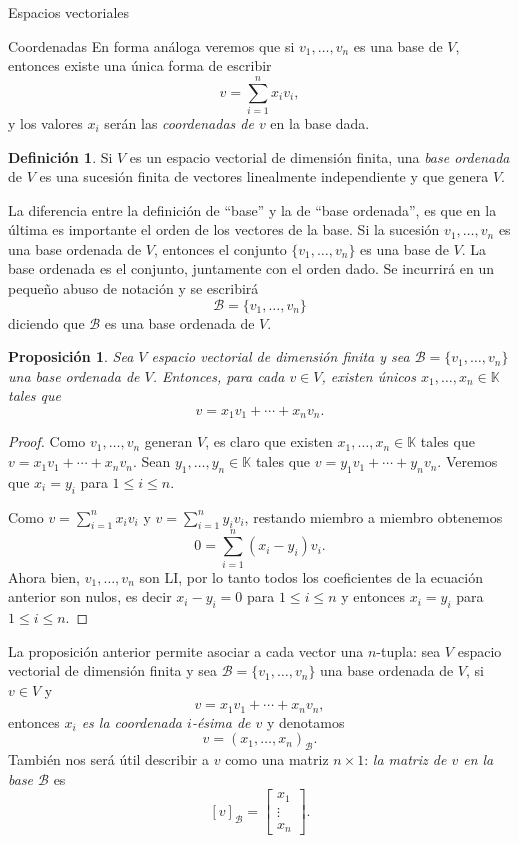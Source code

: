 \documentclass[a4paper,12pt,twoside,spanish,reqno]{amsbook}
\newtheorem{proposicion}[teorema]{Proposici\'on}
\theoremstyle{definition}
\newtheorem{definicion}{Definici\'on}[section]
\theoremstyle{remark}
\newcommand{\K}{\mathbb K}
\begin{document}
\begin{chapter}{Espacios vectoriales}
\begin{section}{Coordenadas}
		En  forma análoga veremos que si $v_1,\ldots,v_n$  es una base de $V$,  entonces existe una única forma de  escribir 
		$$
		v =  \sum_{i=1}^{n} x_iv_i,
		$$ 
		y los valores  $x_i$  serán las \textit{coordenadas de $v$} en la base dada. 
		
		\begin{definicion}
			Si $V$ es un espacio vectorial de dimensión finita, una \textit{base ordenada} de $V$ es una sucesión finita de vectores linealmente independiente y que genera $V$.
		\end{definicion}
		
		
		La diferencia entre la definición de ``base'' y la de ``base ordenada'',  es que en la última es  importante el orden de los vectores de la base. Si la sucesión $v_1,\ldots,v_n$ es una base ordenada de $V$, entonces el conjunto $\{v_1,\ldots,v_n\}$ es una base de $V$. La base ordenada es el conjunto, juntamente con el orden dado. Se incurrirá en un pequeño abuso de notación y se escribirá
		$$
		\mathcal{B} = \{v_1,\ldots,v_n\}
		$$
		diciendo que $\mathcal{B}$ es una base ordenada de $V$.
		
		\begin{proposicion}
			Sea $V$  espacio vectorial de dimensión finita y sea $\mathcal{B} = \{v_1,\ldots,v_n\}$ una base ordenada de $V$. Entonces, para cada $v \in V$,  existen únicos $x_1,\ldots,x_n \in \K$ tales que $$v =   x_1v_1 + \cdots +x_nv_n.$$
		\end{proposicion}
		\begin{proof}
			Como $v_1,\ldots,v_n$  generan $V$,  es claro que existen $x_1,\ldots,x_n \in \K$ tales que $v =   x_1v_1 + \cdots +x_nv_n$. Sean $y_1,\ldots,y_n \in \K$ tales que $v =   y_1v_1 + \cdots +y_nv_n$. Veremos que $x_i = y_i$ para $1 \le i \le n$.
			
			Como $v =  \sum_{i=1}^{n} x_iv_i$ y $v =  \sum_{i=1}^{n} y_iv_i$,  restando miembro a miembro obtenemos 
			$$
			0 =   \sum_{i=1}^{n} (x_i-y_i)v_i.
			$$
			Ahora bien,  $v_1,\ldots,v_n$ son  LI, por lo tanto todos los coeficientes de la ecuación anterior son nulos, es decir $x_i-y_i=0$ para $1 \le i \le n$ y entonces $x_i = y_i$ para $1 \le i \le n$.
		\end{proof}
	
	La proposición anterior permite asociar a cada vector una $n$-tupla: sea $V$  espacio vectorial de dimensión finita y sea $\mathcal{B} = \{v_1,\ldots,v_n\}$ una base ordenada de $V$, si $v \in V$ y $$v =   x_1v_1 + \cdots +x_nv_n,$$  entonces \textit{$x_i$ es la coordenada $i$-ésima de $v$} y denotamos
	$$
	v = (x_1,\ldots,x_n)_{\mathcal B}.
	$$
	También nos será útil describir a $v$ como una matriz $n \times 1$: \textit{la matriz de $v$  en la base  $\mathcal{B}$}  es
	$$
	[v]_\mathcal{B} = \begin{bmatrix}x_1 \\ \vdots \\ x_n\end{bmatrix}.
	$$
	

\end{section}
\end{chapter}
\end{document}
